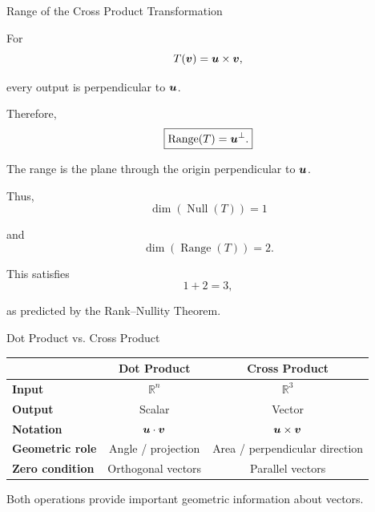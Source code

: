 \begin{frame}{Range of the Cross Product Transformation}

For
\vspace{-0.1cm}
\[
T(\bm{v})
=
\bm{u}\times\bm{v},
\]

every output is perpendicular to $\bm{u}$.

Therefore,
\vspace{-0.1cm}
\[
\boxed{
\operatorname{Range}(T)
=
\bm{u}^{\perp}.
}
\]

The range is the plane through the origin perpendicular
to $\bm{u}$.

Thus,
\vspace{-0.1cm}
\[
\boxed{
\dim(\operatorname{Null}(T))=1
}
\]

and
\vspace{-0.1cm}
\[
\boxed{
\dim(\operatorname{Range}(T))=2.
}
\]

This satisfies
\vspace{-0.1cm}
\[
1+2=3,
\]

as predicted by the Rank--Nullity Theorem.

\end{frame}



\begin{frame}{Dot Product vs. Cross Product}

\begin{center}

\begin{tabular}{>{\bfseries}lcc}
\toprule
 & Dot Product & Cross Product\\
\midrule
Input & $\mathbb{R}^n$ & $\mathbb{R}^3$\\
Output & Scalar & Vector\\
Notation & $\bm{u}\cdot\bm{v}$ &
$\bm{u}\times\bm{v}$\\
Geometric role & Angle / projection &
Area / perpendicular direction\\
Zero condition & Orthogonal vectors &
Parallel vectors\\
\bottomrule
\end{tabular}

\end{center}

\vspace{0.4cm}

Both operations provide important geometric information
about vectors.

\end{frame}